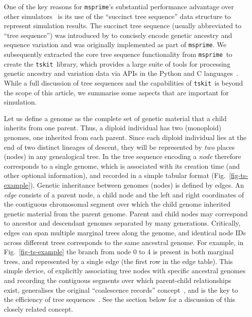 \documentclass{article}
\newcommand{\msprime}[0]{\texttt{msprime}}
\newcommand{\tskit}[0]{\texttt{tskit}}
\begin{document}
One of the key reasons for \msprime's substantial performance advantage
over other simulators~\citep{kelleher2016efficient}
is its use of the ``succinct tree sequence''
data structure to represent simulation results.
The succinct tree sequence (usually abbreviated to ``tree sequence'')
was introduced by \cite{kelleher2016efficient}
to concisely encode genetic ancestry and sequence variation
and was originally implemented as part of \msprime.
We subsequently extracted the core tree sequence functionality
from \msprime\ to create the \tskit\ library,
which provides a large suite of tools for processing genetic ancestry
and variation data via APIs
in the Python and C languages~\citep{tskit2021tskit}.
While a full discussion of tree sequences and the capabilities
of \tskit\ is beyond the scope of this article, we summarise
some aspects that are important for simulation.

Let us define a genome as the complete set of genetic material
that a child inherits from one parent. Thus, a diploid individual
has two (monoploid) genomes, one inherited from each parent. Since
each diploid individual lies at the end of two distinct lineages
of descent, they will be represented by \emph{two} places (nodes)
in any genealogical tree. In the tree sequence encoding a
\emph{node} therefore corresponds to a single genome, which
is associated with its creation time (and other optional information),
and recorded in a simple tabular format (Fig.~\ref{fig-ts-example}).
Genetic inheritance between genomes (nodes) %
is defined by edges.
An \emph{edge} consists of a
parent node, a child node and the left and right coordinates
of the contiguous chromosomal segment over which
the child genome inherited genetic material from the parent genome.
Parent and child nodes may correspond to ancestor and descendant
genomes separated by many generations.
Critically, edges can span multiple marginal trees along the
genome, and identical node IDs across different trees corresponds
to the same ancestral genome.
For example, in Fig.~\ref{fig-ts-example} the branch from node
0 to 4 is present in both marginal trees, and represented
by a single edge (the first row in the edge table).
This simple device, of explicitly associating tree nodes
with specific ancestral genomes and recording the
contiguous segments over which parent-child relationships exist,
generalises the original
``coalescence records'' concept~\citep{kelleher2016efficient},
and is the key to the efficiency of tree
sequences~\citep{
kelleher2018efficient,kelleher2019inferring,ralph2020efficiently}.
See the  section below for a discussion of this
closely related concept.
\end{document}
